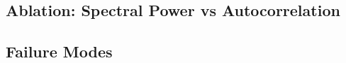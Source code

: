 \subsection{Ablation: Spectral Power vs Autocorrelation}
\label{sec:results:ablation}

\subsection{Failure Modes}
\label{sec:results:failures}
